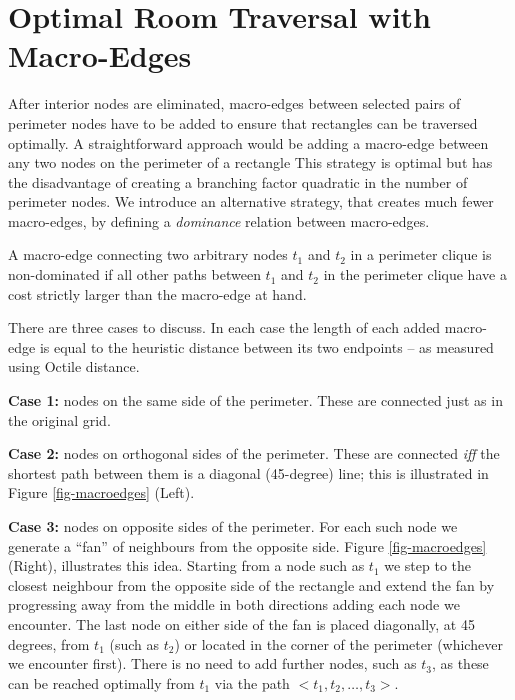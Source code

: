 \section{Optimal Room Traversal with Macro-Edges}

After interior nodes are eliminated, macro-edges between selected pairs of
perimeter nodes have to be added to ensure that rectangles can be traversed
optimally.  A straightforward approach would be adding a macro-edge between any
two nodes on the perimeter of a rectangle
This strategy is optimal but has the disadvantage of creating a branching 
factor quadratic in the number of perimeter nodes. 
We introduce an alternative strategy, that creates much fewer
macro-edges, by defining a \emph{dominance} relation between macro-edges.

\begin{definition}
\label{def:dominance}
A macro-edge connecting two arbitrary nodes $t_1$ and $t_2$ in a perimeter
clique is non-dominated if all other paths between $t_1$ and $t_2$ in the
perimeter clique have a cost strictly larger than the macro-edge at hand.
\end{definition}

There are three cases to discuss. In each case the length of each added macro-edge 
is equal to the heuristic distance between its two endpoints -- as measured
using Octile distance.
\par \noindent
\textbf{Case 1:} nodes on the same side of the perimeter. These are connected
just as in the original grid.
\par \noindent
\textbf{Case 2:} nodes on orthogonal sides of the perimeter.
These are connected \emph{iff} the shortest path between them is a diagonal
(45-degree) line; this is illustrated in Figure \ref{fig-macroedges} (Left).
\par \noindent
\textbf{Case 3:} nodes on opposite sides of the perimeter. For each such node we
generate a ``fan'' of neighbours from the opposite side.  
Figure \ref{fig-macroedges} (Right), illustrates
this idea.  Starting from a node such as $t_{1}$ we step to the closest
neighbour from the opposite side of the rectangle and extend the fan by progressing away
from the middle in both directions adding each node we encounter.  The last node
on either side of the fan is placed diagonally, at 45 degrees, from $t_{1}$
(such as $t_{2}$) or located in the corner of the perimeter (whichever we
encounter first).  There is no need to add further nodes, such as $t_{3}$, as
these can be reached optimally from $t_1$ via the path $< t_1, t_2, \dots,
t_3 > $.

